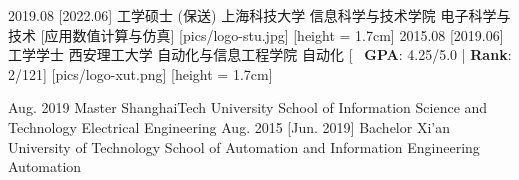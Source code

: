\ifzh
    \begin{educations}[logo]
        \education
        {2019.08}
        [2022.06]
        {工学硕士 (保送)}
        {上海科技大学 }
        {信息科学与技术学院}
        {电子科学与技术}
        [\textbullet 应用数值计算与仿真] %
        [pics/logo-stu.jpg]
        [height = 1.7cm]
        \separator{0.5ex}
        \education
        {2015.08}
        [2019.06]
        {工学学士}
        {西安理工大学 }
        {自动化与信息工程学院}
        {自动化}
        [\textbullet ~ \textbf{GPA}: 4.25/5.0 | \textbf{Rank}: 2/121]
        [pics/logo-xut.png]
        [height = 1.7cm]
    \end{educations}
\else
    \begin{educations}
        \education
        {Aug. 2019}
        {Master}
        {ShanghaiTech University}
        {School of Information Science and Technology}
        {Electrical Engineering}
        \separator{0.5ex}
        \education
        {Aug. 2015}
        [Jun. 2019]
        {Bachelor}
        {Xi'an University of Technology}
        {School of Automation and Information Engineering}
        {Automation}
    \end{educations}
\fi